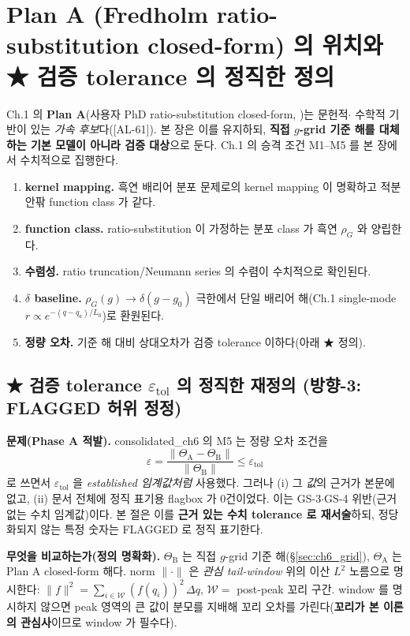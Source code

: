 \documentclass[11pt,a4paper]{article}
\newcommand{\tol}{\mathrm{tol}}
\newcommand{\AL}[1]{\textsf{[AL-#1]}}
\begin{document}
\section{Plan A (Fredholm ratio-substitution closed-form) 의 위치와 ★ 검증 tolerance 의 정직한 정의}\label{sec:ch6_closure}
Ch.1 의 \textbf{Plan A}(사용자 PhD ratio-substitution closed-form, \cite{lee2011,son2013,jcp2017})는 문헌적$\cdot$
수학적 기반이 있는 \emph{가속 후보}다(\AL{61}). 본 장은 이를 유지하되, \textbf{직접 $g$-grid 기준 해를 대체하는
기본 모델이 아니라 검증 대상}으로 둔다. Ch.1 의 승격 조건 M1--M5 를 본 장에서 수치적으로 집행한다.
\begin{enumerate}[label=M\arabic*),leftmargin=2.4em]
\item \textbf{kernel mapping.} 흑연 배리어 분포 문제로의 kernel mapping 이 명확하고 적분 안팎 function class 가 같다.
\item \textbf{function class.} ratio-substitution 이 가정하는 분포 class 가 흑연 $\rho_G$ 와 양립한다.
\item \textbf{수렴성.} ratio truncation/Neumann series 의 수렴이 수치적으로 확인된다.
\item \textbf{$\delta$ baseline.} $\rho_G(g)\to\delta(g-g_0)$ 극한에서 단일 배리어 해(Ch.1 single-mode
  $r\propto e^{-(q-q_a)/L_0}$)로 환원된다.
\item \textbf{정량 오차.} 기준 해 대비 상대오차가 검증 tolerance 이하다(아래 ★ 정의).
\end{enumerate}

\subsection{★ 검증 tolerance $\varepsilon_\tol$ 의 정직한 재정의 (방향-3: FLAGGED 허위 정정)}\label{sec:ch6_epsilon}
\textbf{문제(Phase A 적발).} consolidated\_ch6 의 M5 는 정량 오차 조건을
\[
\varepsilon=\frac{\lVert\Theta_{\mathrm A}-\Theta_{\mathrm B}\rVert}{\lVert\Theta_{\mathrm B}\rVert}\le\varepsilon_\tol
\]
로 쓰면서 $\varepsilon_\tol$ 을 \emph{established 임계값처럼} 사용했다. 그러나 (i) 그 \emph{값}의 근거가 본문에
없고, (ii) 문서 전체에 정직 표기용 flagbox 가 0건이었다. 이는 GS-3$\cdot$GS-4 위반(근거 없는 수치 임계값)이다.
본 절은 이를 \textbf{근거 있는 수치 tolerance 로 재서술}하되, 정당화되지 않는 특정 숫자는 FLAGGED 로 정직 표기한다.

\textbf{무엇을 비교하는가(정의 명확화).} $\Theta_{\mathrm B}$ 는 직접 $g$-grid 기준 해(\S\ref{sec:ch6_grid}),
$\Theta_{\mathrm A}$ 는 Plan A closed-form 해다. norm $\lVert\cdot\rVert$ 은 \emph{관심 tail-window} 위의 이산
$L^2$ 노름으로 명시한다: $\lVert f\rVert^2=\sum_{i\in\mathcal W}(f(q_i))^2\,\Delta q$, $\mathcal W=$ post-peak 꼬리
구간. window 를 명시하지 않으면 peak 영역의 큰 값이 분모를 지배해 꼬리 오차를 가린다(\textbf{꼬리가 본 이론의
관심사}이므로 window 가 필수다).
\end{document}
